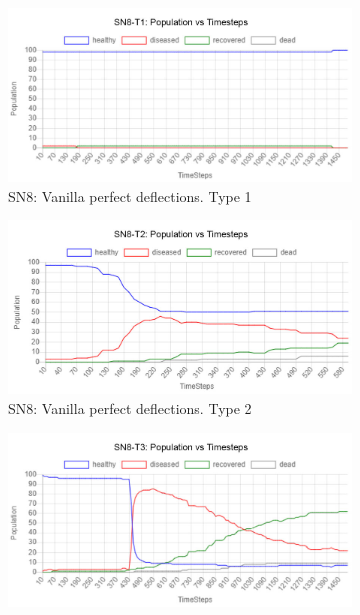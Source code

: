 \documentclass[a4paper,11pt]{article}
\begin{document}
    \begin{figure}[H]
        \centering
        \begin{subfigure}[b]{0.49\linewidth}
            \includegraphics[width=\linewidth]{pop_graphs/SN8-T1_pop.jpg}
            \caption{SN8:  Vanilla perfect deflections. Type 1}
            \label{fig:SN8T1}
        \end{subfigure}
        \begin{subfigure}[b]{0.49\linewidth}
            \includegraphics[width=\linewidth]{pop_graphs/SN8-T2_pop.jpg}
            \caption{SN8:  Vanilla perfect deflections. Type 2}
            \label{fig:SN8T2}
        \end{subfigure}
        \begin{subfigure}[b]{0.49\linewidth}
            \includegraphics[width=\linewidth]{pop_graphs/SN8-T3_pop.jpg}

\end{subfigure}
\end{figure}
\end{document}
